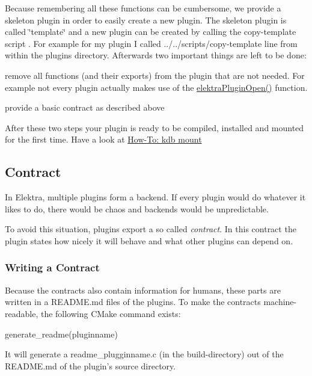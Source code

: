 Because remembering all these functions can be cumbersome, we provide a skeleton plugin in order to easily create a new plugin. The skeleton plugin is called \char`\"{}template\char`\"{} and a new plugin can be created by calling the copy-\/template script . For example for my plugin I called {\ttfamily ../../scripts/copy-\/template line} from within the plugins directory. Afterwards two important things are left to be done\+:


\begin{DoxyItemize}
\item remove all functions (and their exports) from the plugin that are not needed. For example not every plugin actually makes use of the {\ttfamily \hyperlink{elektra_2plugin_8c_a32a70a7876542c51d153164ac5108a57}{elektra\+Plugin\+Open()}} function.
\item provide a basic contract as described above
\end{DoxyItemize}

After these two steps your plugin is ready to be compiled, installed and mounted for the first time. Have a look at \hyperlink{doc_tutorials_mount_md}{How-\/\+To\+: kdb mount}

\subsection*{Contract}

In Elektra, multiple plugins form a backend. If every plugin would do whatever it likes to do, there would be chaos and backends would be unpredictable.

To avoid this situation, plugins export a so called {\itshape contract}. In this contract the plugin states how nicely it will behave and what other plugins can depend on.

\subsubsection*{Writing a Contract}

Because the contracts also contain information for humans, these parts are written in a {\ttfamily R\+E\+A\+D\+M\+E.\+md} files of the plugins. To make the contracts machine-\/readable, the following C\+Make command exists\+:


\begin{DoxyCode}
generate\_readme(pluginname)
\end{DoxyCode}


It will generate a {\ttfamily readme\+\_\+plugginname.\+c} (in the build-\/directory) out of the R\+E\+A\+D\+M\+E.\+md of the plugin’s source directory.

